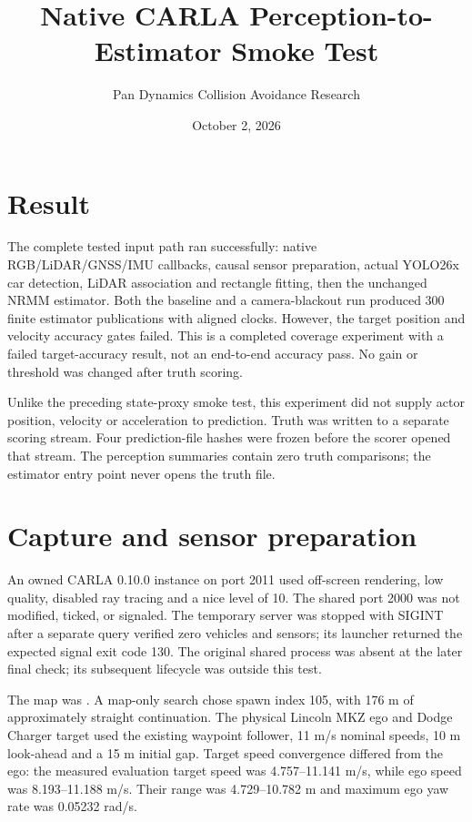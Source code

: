 \documentclass[11pt]{article}
\title{Native CARLA Perception-to-Estimator Smoke Test}
\author{Pan Dynamics Collision Avoidance Research}
\date{October 2, 2026}
\begin{document}
\maketitle

\section{Result}
The complete tested input path ran successfully:
native RGB/LiDAR/GNSS/IMU callbacks, causal sensor preparation, actual YOLO26x
car detection, LiDAR association and rectangle fitting, then the unchanged
NRMM estimator. Both the baseline and a camera-blackout run produced 300
finite estimator publications with aligned clocks. However, the target
position and velocity accuracy gates failed. This is a completed coverage
experiment with a failed target-accuracy result, not an end-to-end accuracy
pass. No gain or threshold was changed after truth scoring.

Unlike the preceding state-proxy smoke test, this experiment did not supply
actor position, velocity or acceleration to prediction. Truth was written to
a separate scoring stream. Four prediction-file hashes were frozen before
the scorer opened that stream. The perception summaries contain zero truth
comparisons; the estimator entry point never opens the truth file.

\section{Capture and sensor preparation}
An owned CARLA 0.10.0 instance on port 2011 used off-screen rendering,
low quality, disabled ray tracing and a nice level of 10. The shared port 2000
was not modified, ticked, or signaled. The temporary server was stopped with
SIGINT after a separate query verified zero vehicles and sensors; its launcher
returned the expected signal exit code 130. The original shared process was
absent at the later final check; its subsequent lifecycle was outside this test.

The map was . A map-only search chose spawn
index 105, with 176 m of approximately straight continuation. The physical
Lincoln MKZ ego and Dodge Charger target used the existing waypoint follower,
11 m/s nominal speeds, 10 m look-ahead and a 15 m initial gap. Target speed
convergence differed from the ego: the measured evaluation target speed was
4.757--11.141 m/s, while ego speed was 8.193--11.188 m/s. Their range was
4.729--10.782 m and maximum ego yaw rate was 0.05232 rad/s.
\end{document}

